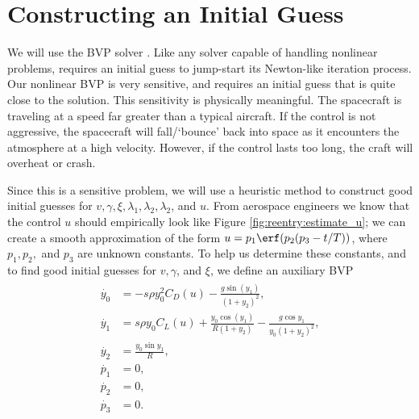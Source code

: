 \section*{Constructing an Initial Guess}
We will use the BVP solver .
Like any solver capable of handling nonlinear problems,  requires an initial guess to jump-start its Newton-like iteration process.
Our nonlinear BVP is very sensitive, and requires an initial guess that is quite close to the solution.  
This sensitivity is physically meaningful. 
The spacecraft is traveling at a speed far greater than a typical aircraft. 
If the control is not aggressive, the spacecraft will fall/`bounce' back into space as it encounters the atmosphere at a high velocity. 
However, if the control lasts too long, the craft will overheat or crash.

Since this is a sensitive problem, we will use a heuristic method to construct good initial guesses for $v, \gamma, \xi, \lambda_1, \lambda_2,\lambda_2$, and $u$.
From aerospace engineers we know that the control $u$ should empirically look like Figure \ref{fig:reentry:estimate_u}; 
we can create a smooth approximation of the form $u = p_1\erf(p_2(p_3-t/T))$, where $p_1, p_2,$ and $p_3$ are unknown constants. 
To help us determine these constants, and to find good initial guesses for $v, \gamma$, and $\xi$, we define an auxiliary BVP
\begin{align}
\begin{split}
\dot{y_0} &= -s\rho y_0^2C_D(u) - \frac{g\sin(y_1)}{(1+y_2)^2},\\
\dot{y_1} &= s \rho y_0 C_L(u) + \frac{y_0 \cos(y_1)}{R(1+y_2)} - \frac{g \cos y_1}{y_0(1+y_2)^2},\\
\dot{y_2} &= \frac{y_0 \sin y_1}{R} ,\\
\dot{p_1} &= 0, \\
\dot{p_2} &= 0, \\
\dot{p_3} &= 0.
\end{split} \label{eqn:reentry:control_system_auxiliary}
\end{align}

